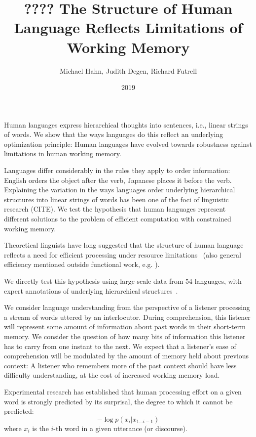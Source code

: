 \documentclass[11pt,letterpaper]{article}
\title{???? The Structure of Human Language Reflects Limitations of Working Memory}
\author{Michael Hahn, Judith Degen, Richard Futrell}
\date{2019}
\begin{document}
\maketitle




Human languages express hierarchical thoughts into sentences, i.e., linear strings of words.
We show that the ways languages do this reflect an underlying optimization principle:
Human languages have evolved towards robustness against limitations in human working memory.

Languages differ considerably in the rules they apply to order information: English orders the object after the verb, Japanese places it before the verb.
Explaining the variation in the ways languages  order underlying hierarchical structures into linear strings of words has been one of the foci of linguistic research (CITE).
We test the hypothesis that human languages represent different solutions to the problem of efficient computation with constrained working memory.

Theoretical linguists have long suggested that the structure of human language reflects a need for efficient processing under resource limitations~\citep{berwick1984grammatical,hawkins1994performance} (also general efficiency mentioned outside functional work, e.g. \citep{chomsky2005three,hauser2002faculty}).


We directly test this hypothesis using large-scale data from 54 languages, with expert annotations of underlying hierarchical structures~\citep{nivre-universal-2017}.



We consider language understanding from the perspective of a listener processing a stream of words uttered by an interlocutor.
During comprehension, this listener will represent some amount of information about past words in their short-term memory.
We consider the question of how many bits of information this listener has to carry from one instant to the next.
We expect that a listener's ease of comprehension will be modulated by the amount of memory held about previous context:
A listener who remembers more of the past context should have less difficulty understanding, at the cost of increased working memory load.





Experimental research has established that human processing effort on a given word is strongly predicted by its surprisal, the degree to which it cannot be predicted:
\begin{equation}\label{eq:surp}
	-\log p(x_i|x_{1...i-1})
\end{equation}
where $x_i$ is the $i$-th word in a given utterance (or discourse).
\end{document}
